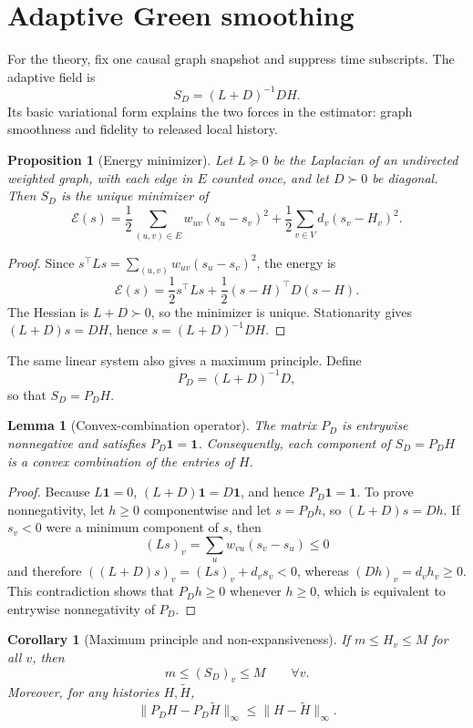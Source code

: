 \documentclass[11pt]{article}
\newtheorem{proposition}[theorem]{Proposition}
\newtheorem{lemma}[theorem]{Lemma}
\newtheorem{corollary}[theorem]{Corollary}
\theoremstyle{definition}
\theoremstyle{remark}
\newcommand{\one}{\mathbf{1}}
\newcommand{\calE}{\mathcal{E}}
\newcommand{\SD}{S_D}
\begin{document}
\section{Adaptive Green smoothing}
\label{sec:theory}

For the theory, fix one causal graph snapshot and suppress time subscripts. The adaptive field is
\[
    \SD=(L+D)^{-1}DH.
\]
Its basic variational form explains the two forces in the estimator: graph smoothness and fidelity to released local history.

\begin{proposition}[Energy minimizer]
Let $L\succeq0$ be the Laplacian of an undirected weighted graph, with each edge in $E$ counted once, and let $D\succ0$ be diagonal. Then $\SD$ is the unique minimizer of
\begin{equation}
    \calE(s)=\frac12\sum_{(u,v)\in E}w_{uv}(s_u-s_v)^2
    +\frac12\sum_{v\in V}d_v(s_v-H_v)^2.
    \label{eq:energy}
\end{equation}
\end{proposition}

\begin{proof}
Since $s^\top Ls=\sum_{(u,v)}w_{uv}(s_u-s_v)^2$, the energy is
\[
    \calE(s)=\frac12s^\top Ls+\frac12(s-H)^\top D(s-H).
\]
The Hessian is $L+D\succ0$, so the minimizer is unique. Stationarity gives $(L+D)s=DH$, hence $s=(L+D)^{-1}DH$.
\end{proof}

The same linear system also gives a maximum principle. Define
\[
    P_D=(L+D)^{-1}D,
\]
so that $S_D=P_DH$.

\begin{lemma}[Convex-combination operator]
The matrix $P_D$ is entrywise nonnegative and satisfies $P_D\one=\one$. Consequently, each component of $S_D=P_DH$ is a convex combination of the entries of $H$.
\end{lemma}

\begin{proof}
Because $L\one=0$, $(L+D)\one=D\one$, and hence $P_D\one=\one$. To prove nonnegativity, let $h\ge0$ componentwise and let $s=P_Dh$, so $(L+D)s=Dh$. If $s_v<0$ were a minimum component of $s$, then
\[
    (Ls)_v=\sum_u w_{vu}(s_v-s_u)\le0
\]
and therefore $((L+D)s)_v=(Ls)_v+d_vs_v<0$, whereas $(Dh)_v=d_vh_v\ge0$. This contradiction shows that $P_Dh\ge0$ whenever $h\ge0$, which is equivalent to entrywise nonnegativity of $P_D$.
\end{proof}

\begin{corollary}[Maximum principle and non-expansiveness]
If $m\le H_v\le M$ for all $v$, then
\[
    m\le (S_D)_v\le M\qquad \forall v.
\]
Moreover, for any histories $H,\widetilde H$,
\[
    \|P_DH-P_D\widetilde H\|_\infty\le \|H-\widetilde H\|_\infty.
\]
\end{corollary}
\end{document}
